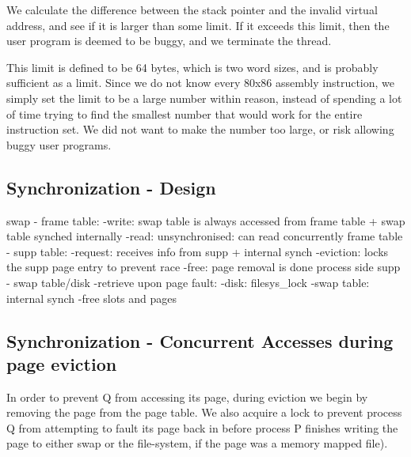 
We calculate the difference between the stack pointer and the invalid virtual
address, and see if it is larger than some limit. If it exceeds this limit, then
the user program is deemed to be buggy, and we terminate the thread.

This limit is defined to be 64 bytes, which is two word sizes, and is probably
sufficient as a limit.  Since we do not know every 80x86 assembly instruction,
we simply set the limit to be a large number within reason, instead of spending
a lot of time trying to find the smallest number that would work for the entire
instruction set. We did not want to make the number too large, or risk allowing
buggy user programs.

\subsection{Synchronization - Design}

swap - frame table:
  -write: swap table is always accessed from frame table + swap table synched internally
  -read: unsynchronised: can read concurrently %
frame table - supp table:
  -request: receives info from supp + internal synch
  -eviction: locks the supp page entry to prevent race
  -free: page removal is done process side
supp - swap table/disk
  -retrieve upon page fault:
    -disk: filesys\_lock
    -swap table: internal synch
  -free slots and pages

\subsection{Synchronization - Concurrent Accesses during page eviction}

In order to prevent Q from accessing its page, during eviction we begin by removing the page from the page table.
We also acquire a lock to prevent process Q from attempting to fault its page back in before process P finishes writing the page to either swap or the file-system, if the page was a memory mapped file).

